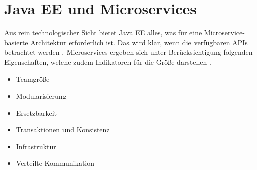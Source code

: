 \section{Java EE und Microservices}
Aus rein technologischer Sicht bietet Java EE alles, was für eine Microservice-basierte Architektur erforderlich ist. Das wird klar, wenn die verfügbaren APIs betrachtet werden \cite{jaxcenter.2016}. Microservices ergeben sich unter Berücksichtigung folgenden Eigenschaften, welche zudem Indikatoren für die Größe darstellen \cite{EberhardWolff.2015}.
\begin{itemize}
	\item Teamgröße
	\item Modularisierung
	\item Ersetzbarkeit
	\item Transaktionen und Konsistenz
	\item Infrastruktur
	\item Verteilte Kommunikation	
\end{itemize}

